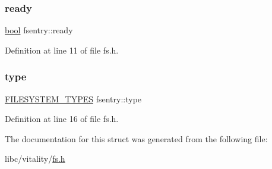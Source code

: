 \mbox{\label{a00272_a284522ed97fe1eeebd0fcc039b2ea00a_a284522ed97fe1eeebd0fcc039b2ea00a}} 
\subsubsection{\texorpdfstring{ready}{ready}}
{\footnotesize\ttfamily \hyperlink{a00140_af6a258d8f3ee5206d682d799316314b1_af6a258d8f3ee5206d682d799316314b1}{bool} fsentry\+::ready}



Definition at line 11 of file fs.\+h.

\mbox{\label{a00272_acbab3dd44174c8f74e1d9305a13c7dbb_acbab3dd44174c8f74e1d9305a13c7dbb}} 
\subsubsection{\texorpdfstring{type}{type}}
{\footnotesize\ttfamily \hyperlink{a00161_a2e9d0c3765a28910638672bfc746181b_a2e9d0c3765a28910638672bfc746181b}{F\+I\+L\+E\+S\+Y\+S\+T\+E\+M\+\_\+\+T\+Y\+P\+ES} fsentry\+::type}



Definition at line 16 of file fs.\+h.



The documentation for this struct was generated from the following file\+:\begin{DoxyCompactItemize}
\item 
libc/vitality/\hyperlink{a00152}{fs.\+h}\end{DoxyCompactItemize}

